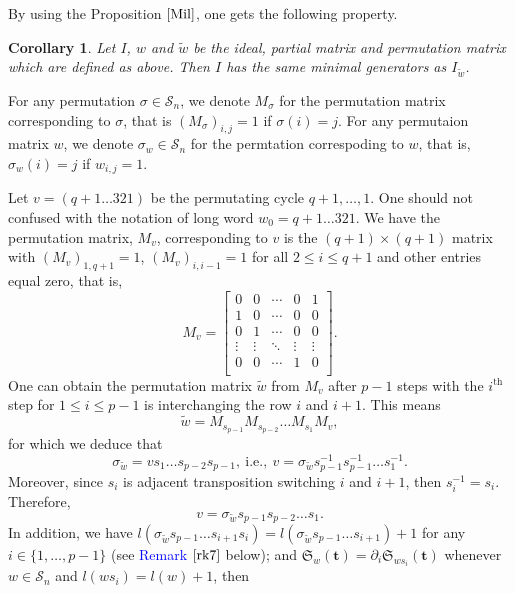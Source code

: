 \documentclass[11pt]{article}
\numberwithin{Property}{section}
\numberwithin{Theorem}{section}
\numberwithin{Proposition}{section}
\numberwithin{Lemma}{section}
\newtheorem{Corollary}{Corollary}%
\numberwithin{Corollary}{section}
\numberwithin{Definition}{section}
\numberwithin{Remark}{section}
\numberwithin{Conjecture}{section}
\numberwithin{Problem}{section}
\numberwithin{Example}{section}
\numberwithin{Claim}{section}
\renewcommand{\leq}{\leqslant}
\newcommand{\improve}[1]{\textcolor{blue}{#1}} %
\begin{document}
By using the Proposition $\ref{Mil}$, one gets the following property. 
\begin{Corollary}\label{corr} Let $I$, $w$ and $\tilde{w}$ be the ideal, partial matrix and permutation matrix which are defined as above. Then $I$ has the same minimal generators as $I_{\tilde{w}}$.
\end{Corollary}
 For any permutation $\sigma \in \mathcal{S}_n$, we denote $M_{\sigma}$ for the permutation matrix corresponding to $\sigma$, that is $(M_{\sigma})_{i,j} = 1$ if $\sigma(i) = j$. For any permutaion matrix $w$, we denote $\sigma_{w} \in \mathcal{S}_n$ for the permtation correspoding to $w$, that is, $\sigma_{w}(i) = j$ if $w_{i,j} = 1$. 
 
Let $v = (q+1 \ldots 321)$ be the permutating cycle $q+1, \ldots, 1$. One should not confused with the notation of long word $w_0 = q+1 \ldots 321$. We have the permutation matrix, $M_v$, corresponding to $v$ is the $(q+1)\times (q+1)$ matrix with $(M_v)_{1,q+1} = 1$, $(M_v)_{i,i-1} = 1$ for all $2 \leq i \leq q+1$ and other entries equal zero, that is, 
 \[
M_v = \left[\begin{matrix}
0 & 0 & \cdots & 0 & 1\\ 
1 & 0 & \cdots & 0 & 0\\
0 & 1 & \cdots & 0 & 0\\
\vdots & \vdots & \ddots & \vdots & \vdots \\
0 & 0 & \cdots & 1 & 0\\
\end{matrix}\right]. 
 \]
One can obtain the permutation matrix $\tilde{w}$ from $M_v$ after $p-1$ steps with the $i^{\mathrm{th}}$ step for $1\leq i \leq p-1$ is  interchanging the row $i$ and $i+1$. This means 
\[
\tilde{w} = M_{s_{p-1}}M_{s_{p-2}}\ldots M_{s_{1}}M_v, 
\]
for which we deduce that 
\[
\sigma_{\tilde{w}} = vs_1\ldots s_{p-2}s_{p-1}, \ \mathrm{i.e.,} \ v = \sigma_{\tilde{w}}s_{p-1}^{-1}s_{p-1}^{-1}\ldots s_1^{-1}.\]
Moreover, since $s_i$ is adjacent transposition switching $i$ and $i+1$, then $s_i^{-1} = s_i$. Therefore, 
\[
v = \sigma_{\tilde{w}}s_{p-1}s_{p-2}\ldots s_1.
\]
In addition, we have $l(\sigma_{\tilde{w}}s_{p-1} \ldots s_{i+1}s_i) = l(\sigma_{\tilde{w}}s_{p-1} \ldots s_{i+1}) + 1$ for any $i \in \{1, \ldots, p-1\}$ (see \improve{Remark $\ref{rk7}$} below); and $\mathfrak{S}_w(\mathbf{t}) = \partial_i\mathfrak{S}_{ws_i}(\mathbf{t})$ whenever $w \in  \mathcal{S}_n$ and $l(ws_i) = l(w) + 1$, then 
\end{document}
